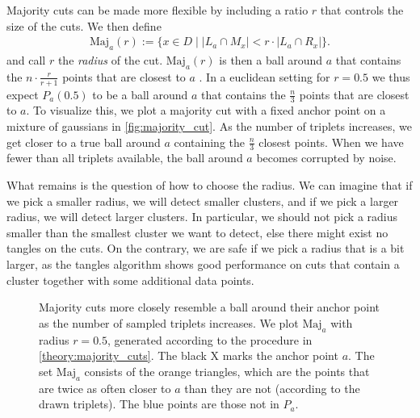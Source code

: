 Majority cuts can be made more flexible by including a ratio $r$ that controls the size of the cuts. 
We then define 
\begin{align*}
\text{Maj}_a(r) := \{x \in D \mid \left|   L_a \cap M_x\right| < r \cdot \left| L_a \cap R_x \right| \}
.\end{align*}
and call $r$ the \textit{radius} of the cut. 
$\text{Maj} _a(r)$ is then a ball around $a$ that contains the $n \cdot \frac{r}{r+1}$ points that are closest to $a$ . In a euclidean setting for 
$r = 0.5$ we thus expect $P_a(0.5)$ to be a ball around $a$ that contains the $\frac{n}{3}$ points that are closest to $a$. To visualize this, we plot a majority cut with a fixed anchor point on a 
mixture of gaussians in \autoref{fig:majority_cut}. 
As the number of triplets increases, we get closer to a true ball around $a$ containing the $\frac{n}{3}$ closest points. 
When we have fewer than all triplets available, the ball around $a$ becomes corrupted by noise.

What remains is the question of how to choose the radius. We can imagine that if we pick a smaller radius, we will detect smaller clusters, and if we pick a larger radius, we will detect larger
clusters. 
In particular, we should not pick a radius smaller than the smallest cluster we want to detect, else there might exist no tangles on the cuts. 
On the contrary, we are safe if we pick a radius that is a bit larger, as the tangles algorithm shows good performance on cuts that contain a cluster together with some additional data points.

\onecolumn
\begin{figure}[ht]
    \centering
    \subfloat[500 (0.47\%) triplets]{%
      \resizebox{0.5\textwidth}{!}{}
  }
    \subfloat[5000 (4.7\%) triplets]{%
      \resizebox{0.5\textwidth}{!}{}}
    \hfill
    \subfloat[20000 (18.8\%) triplets]{%
      \resizebox{0.5\textwidth}{!}{}}
    \subfloat[106200 (100\%) triplets]{%
      \resizebox{0.5\textwidth}{!}{}}
    \caption{Majority cuts more closely resemble a ball around their anchor point as the number of 
        sampled triplets increases. 
        We plot $\text{Maj}_a$ with radius $r=0.5$, generated according to the procedure in \autoref{theory:majority_cuts}. The black X marks the anchor point $a$. 
        The set $\text{Maj}_a$ consists of the orange triangles, which are the points that are twice as often closer to $a$ than they are not (according to the drawn triplets). 
        The blue points are those not in $P_a$.}
    \label{fig:majority_cut}
\end{figure}
